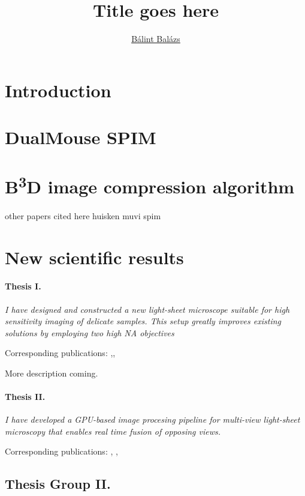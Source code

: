 \documentclass{booklet_style}
\author{\href{mailto:balint.balazs@embl.de}{Bálint Balázs}}
\title{Title goes here}
\def\b3d{B\textsuperscript{3}D}
\begin{document}
\maketitle

\newpage
\setcounter{page}{1}
\section{Introduction}


\section{DualMouse SPIM}

\section{\b3d image compression algorithm}
other papers cited here
huisken \cite{huisken_optical_2004}
muvi spim \cite{krzic_multiview_2012}

\section{New scientific results}

\paragraph{Thesis I.}\textit{I have designed and constructed a new light-sheet microscope suitable for high sensitivity imaging of delicate samples. This setup greatly improves existing solutions by employing two high NA objectives}

Corresponding publications: \cite{de_medeiros_light-sheet_2016},\cite{strnad_inverted_2016}, \cite{hoyer_breaking_2016}

More description coming. %

\paragraph{Thesis II.} \textit{I have developed a GPU-based image procesing pipeline for multi-view light-sheet microscopy that enables real time fusion of opposing views.}

Corresponding publications: \cite{balazs_gpu-based_2016}, \cite{balazs_gpu-based_2016-1}, \cite{balazs_gpu-based_2017}

\subsection*{Thesis Group II.}
\end{document}
